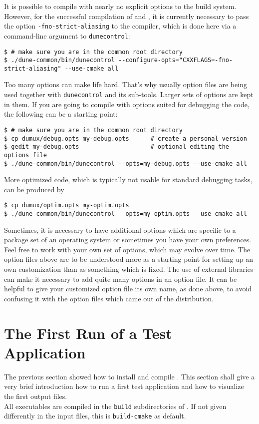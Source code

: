It is possible to compile \Dumux with nearly no explicit options to the build system.
However, for the successful compilation of \Dune and \Dumux, it is currently necessary to pass
the option \texttt{-fno-strict-aliasing} to the \Cplusplus compiler,
which is done here via a command-line argument to \texttt{dunecontrol}:
\begin{lstlisting}[style=Bash]
$ # make sure you are in the common root directory
$ ./dune-common/bin/dunecontrol --configure-opts="CXXFLAGS=-fno-strict-aliasing" --use-cmake all
\end{lstlisting}

Too many options can make life hard. That's why usually option files are being used together with \texttt{dunecontrol} and its sub-tools.
Larger sets of options are kept in them. If you are going to compile with options suited for debugging the code, the following
can be a starting point:
\begin{lstlisting}[style=Bash]
$ # make sure you are in the common root directory
$ cp dumux/debug.opts my-debug.opts      # create a personal version
$ gedit my-debug.opts                    # optional editing the options file
$ ./dune-common/bin/dunecontrol --opts=my-debug.opts --use-cmake all
\end{lstlisting}

More optimized code, which is typically not usable for standard debugging tasks, can be produced by
\begin{lstlisting}[style=Bash]
$ cp dumux/optim.opts my-optim.opts
$ ./dune-common/bin/dunecontrol --opts=my-optim.opts --use-cmake all
\end{lstlisting}

Sometimes, it is necessary to have additional options which
are specific to a package set of an operating system or
sometimes you have your own preferences.
Feel free to work with your own set of options, which may evolve over time.
The option files above are to be understood more as a starting point
for setting up an own customization than as something which is fixed.
The use of external libraries can make it necessary to add quite many options in an option file.
It can be helpful to give your customized option file its own name, as done above,
to avoid confusing it with the option files which came out of the distribution.

\section{The First Run of a Test Application}
\label{quick-start-guide}
The previous section showed how to install and compile \Dumux. This section
shall give a very brief introduction how to run a first test application and how
to visualize the first output files.\\
All executables are compiled in the \texttt{build} subdirectories of \Dumux.
If not given differently in the input files, this is \texttt{build-cmake} as default.

